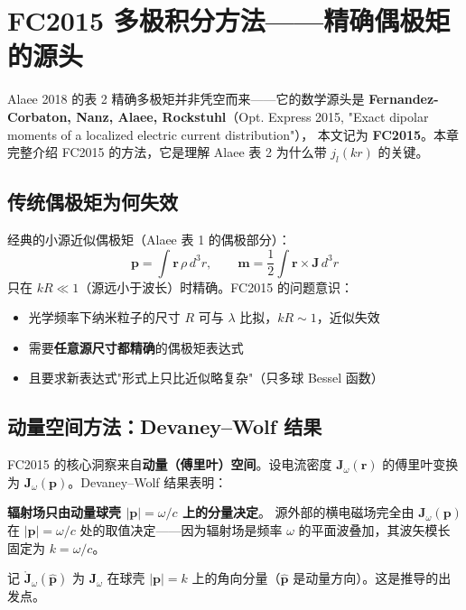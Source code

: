 \section{FC2015 多极积分方法——精确偶极矩的源头}

Alaee 2018 的表 2 精确多极矩并非凭空而来——它的数学源头是
\textbf{Fernandez-Corbaton, Nanz, Alaee, Rockstuhl}（Opt. Express 2015,
"Exact dipolar moments of a localized electric current distribution"），
本文记为 \textbf{FC2015}。本章完整介绍 FC2015 的方法，它是理解
Alaee 表 2 为什么带 $j_l(kr)$ 的关键。

\subsection{传统偶极矩为何失效}

经典的小源近似偶极矩（Alaee 表 1 的偶极部分）：
\begin{equation}
  \mathbf{p} = \int \mathbf{r}\,\rho\,d^3r,\qquad
  \mathbf{m} = \frac12\int \mathbf{r}\times\mathbf{J}\,d^3r
\end{equation}
只在 $kR\ll1$（源远小于波长）时精确。FC2015 的问题意识：
\begin{itemize}
  \item 光学频率下纳米粒子的尺寸 $R$ 可与 $\lambda$ 比拟，$kR\sim1$，近似失效
  \item 需要\textbf{任意源尺寸都精确}的偶极矩表达式
  \item 且要求新表达式"形式上只比近似略复杂"（只多球 Bessel 函数）
\end{itemize}

\subsection{动量空间方法：Devaney--Wolf 结果}

FC2015 的核心洞察来自\textbf{动量（傅里叶）空间}。设电流密度 $\mathbf{J}_\omega(\mathbf{r})$
的傅里叶变换为 $\mathbf{J}_\omega(\mathbf{p})$。Devaney--Wolf 结果表明：

\begin{nontrivial}
\textbf{辐射场只由动量球壳 $|\mathbf{p}|=\omega/c$ 上的分量决定}。
源外部的横电磁场完全由 $\mathbf{J}_\omega(\mathbf{p})$ 在 $|\mathbf{p}|=\omega/c$
处的取值决定——因为辐射场是频率 $\omega$ 的平面波叠加，其波矢模长固定为 $k=\omega/c$。
\end{nontrivial}

记 $\mathring{\mathbf{J}}_\omega(\hat{\mathbf{p}})$ 为 $\mathbf{J}_\omega$ 在球壳
$|\mathbf{p}|=k$ 上的角向分量（$\hat{\mathbf{p}}$ 是动量方向）。这是推导的出发点。

